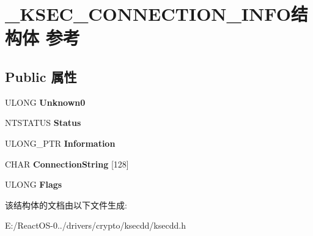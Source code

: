 \hypertarget{struct___k_s_e_c___c_o_n_n_e_c_t_i_o_n___i_n_f_o}{}\section{\+\_\+\+K\+S\+E\+C\+\_\+\+C\+O\+N\+N\+E\+C\+T\+I\+O\+N\+\_\+\+I\+N\+F\+O结构体 参考}
\label{struct___k_s_e_c___c_o_n_n_e_c_t_i_o_n___i_n_f_o}
\subsection*{Public 属性}
\begin{DoxyCompactItemize}
\item 
\mbox{\label{struct___k_s_e_c___c_o_n_n_e_c_t_i_o_n___i_n_f_o_a0b4e90981c10beac2fdae378eaa856fd}} 
U\+L\+O\+NG {\bfseries Unknown0}
\item 
\mbox{\label{struct___k_s_e_c___c_o_n_n_e_c_t_i_o_n___i_n_f_o_a16dedb342a11429056b13986a7c33cd9}} 
N\+T\+S\+T\+A\+T\+US {\bfseries Status}
\item 
\mbox{\label{struct___k_s_e_c___c_o_n_n_e_c_t_i_o_n___i_n_f_o_a4d1c753900f5956f05ae53593fea4798}} 
U\+L\+O\+N\+G\+\_\+\+P\+TR {\bfseries Information}
\item 
\mbox{\label{struct___k_s_e_c___c_o_n_n_e_c_t_i_o_n___i_n_f_o_a8ba2703c4e7ce67af19e6afb6fc0dc6a}} 
C\+H\+AR {\bfseries Connection\+String} \mbox{[}128\mbox{]}
\item 
\mbox{\label{struct___k_s_e_c___c_o_n_n_e_c_t_i_o_n___i_n_f_o_a2ebebab597bd3f482bea3ce7545db9a3}} 
U\+L\+O\+NG {\bfseries Flags}
\end{DoxyCompactItemize}


该结构体的文档由以下文件生成\+:\begin{DoxyCompactItemize}
\item 
E\+:/\+React\+O\+S-\/0../drivers/crypto/ksecdd/ksecdd.\+h\end{DoxyCompactItemize}
